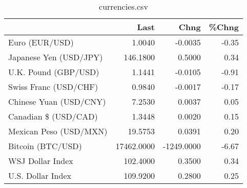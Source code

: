 \documentclass{article}%
\begin{document}
%


\begin{table}[htbp]%
\caption{currencies.csv}%
\centering%
\begin{adjustbox}{width=1\textwidth}%
\begin{tabular}{lrrr}
\toprule
                       &       Last &       Chng &  \%Chng \\
\midrule
        Euro (EUR/USD) &     1.0040 &    -0.0035 &  -0.35 \\
Japanese Yen (USD/JPY) &   146.1800 &     0.5000 &   0.34 \\
  U.K. Pound (GBP/USD) &     1.1441 &    -0.0105 &  -0.91 \\
 Swiss Franc (USD/CHF) &     0.9840 &    -0.0017 &  -0.17 \\
Chinese Yuan (USD/CNY) &     7.2530 &     0.0037 &   0.05 \\
  Canadian \$ (USD/CAD) &     1.3448 &     0.0020 &   0.15 \\
Mexican Peso (USD/MXN) &    19.5753 &     0.0391 &   0.20 \\
     Bitcoin (BTC/USD) & 17462.0000 & -1249.0000 &  -6.67 \\
      WSJ Dollar Index &   102.4000 &     0.3500 &   0.34 \\
     U.S. Dollar Index &   109.9200 &     0.2800 &   0.25 \\
\bottomrule
\end{tabular}
%
\end{adjustbox}%
\end{table}

%
\end{document}

